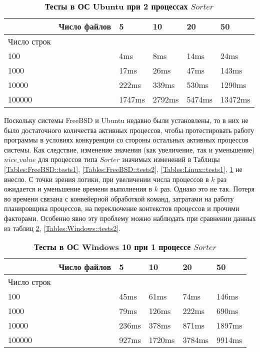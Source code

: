 \begin{table}[H]
\begin{tabularx}{\textwidth}{|X|X|X|X|X|X|}
\hline
&Число файлов& 5 & 10 & 20 & 50 \\
\hline
Число строк&&&&&\\
\hline
100 && 4ms & 8ms & 14ms & 24ms\\
\hline
1000 && 17ms & 26ms & 47ms & 143ms\\
\hline
10000 && 222ms & 339ms & 530ms & 1290ms\\
\hline
100000 && 1747ms & 2792ms & 5474ms & 13472ms\\
\hline
\end{tabularx}
\caption{\textbf{Тесты в ОС Ubuntu при 2 процессах $Sorter$}}
\label{Tables:Linux::tests2}
\end{table}
Поскольку системы FreeBSD и Ubuntu недавно были установлены, то в них не было достаточного количества активных процессов, чтобы протестировать работу программы в условиях конкуренции со стороны остальных активных процессов системы. Как следствие, изменение значения (как увеличение, так и уменьшение) $nice\_value$ для процессов типа $Sorter$ значимых изменений в Таблицы \ref{Tables:FreeBSD::tests1}, \ref{Tables:FreeBSD::tests2}, \ref{Tables:Linux::tests1}, \ref{Tables:Linux::tests2} не внесло. С точки зрения логики, при увеличении числа процессов в $k$ раз ожидается и уменьшение времени выполнения в $k$ раз. Однако это не так. Потеря во времени связана с конвейерной обработкой команд, затратами на работу планировщика процессов, на переключение контекстов процессов и прочими факторами.
Особенно явно эту проблему можно наблюдать при сравнении данных из таблиц \ref{Tables:Windows::tests1}, \ref{Tables:Windows::tests2}.
\begin{table}[H]
\begin{tabularx}{\textwidth}{|X|X|X|X|X|X|}
\hline
&Число файлов& 5 & 10 & 20 & 50 \\
\hline
Число строк&&&&&\\
\hline
100 && 45ms & 61ms & 74ms & 146ms\\
\hline
1000 && 79ms & 126ms & 222ms & 690ms\\
\hline
10000 && 236ms & 378ms & 871ms & 1897ms\\
\hline
100000 && 927ms & 1720ms & 3784ms & 9914ms\\
\hline
\end{tabularx}
\caption{\textbf{Тесты в ОС Windows 10 при 1 процессе $Sorter$}}
\label{Tables:Windows::tests1}
\end{table} 

